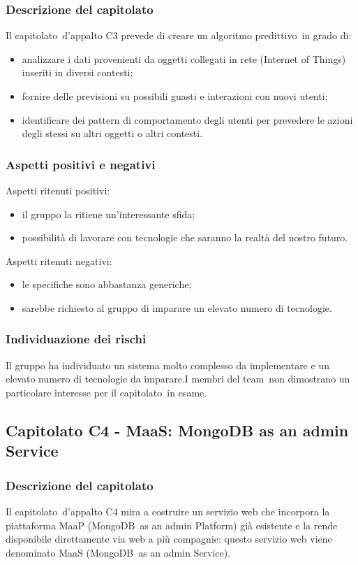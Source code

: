 \documentclass[../StudioDiFattibilita.tex]{subfiles}
\begin{document}
		\subsubsection{Descrizione del capitolato}
		Il capitolato\g\ d'appalto C3 prevede di creare un algoritmo predittivo\g\ in grado di:
		\begin{itemize}
		\item analizzare i dati provenienti da oggetti collegati in rete (Internet of Things\g) inseriti in diversi contesti;
	    \item fornire delle previsioni su possibili guasti e interazioni con nuovi utenti;
		\item identificare dei pattern di comportamento degli utenti per prevedere le azioni degli stessi su altri oggetti o altri contesti.
	    \end{itemize}
		\subsubsection{Aspetti positivi e negativi}
		Aspetti ritenuti positivi:
			\begin{itemize}
				\item il gruppo la ritiene un'interessante sfida;
				\item possibilità di lavorare con tecnologie che saranno la realtà del nostro futuro.
			\end{itemize}
		Aspetti ritenuti negativi:
			\begin{itemize}
				\item le specifiche sono abbastanza generiche;
				\item sarebbe richiesto al gruppo di imparare un elevato numero di tecnologie.
			\end{itemize}
		\subsubsection{Individuazione dei rischi}
		Il gruppo ha individuato un sistema molto complesso da implementare e un elevato numero di tecnologie da imparare.I membri del team\g\ non dimostrano un particolare interesse per il capitolato\g\ in esame.
	\subsection{Capitolato C4 - MaaS: MongoDB as an admin Service}
		\subsubsection{Descrizione del capitolato}
		Il capitolato\g\ d'appalto C4 mira a costruire un servizio web che incorpora la piattaforma MaaP (MongoDB\g\ as an admin Platform) già esistente e la rende disponibile direttamente via web a più compagnie: questo servizio web viene denominato MaaS (MongoDB\g\ 
as an admin Service).
\end{document}
